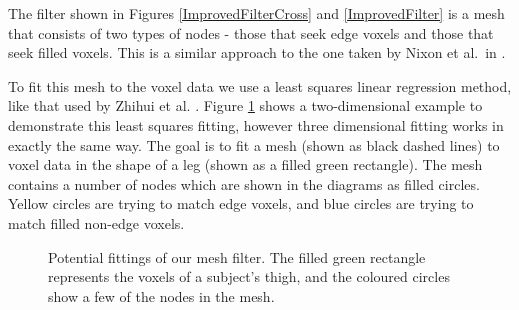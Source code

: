 \documentclass[a4paper,12pt]{article}
\begin{document}
The filter shown in Figures \ref{ImprovedFilterCross} and \ref{ImprovedFilter} is a mesh that consists of two types of nodes - those that seek edge voxels and those that seek filled voxels.
This is a similar approach to the one taken by Nixon et al.\ in \cite{GaitBook}.

\clearpage
To fit this mesh to the voxel data we use a least squares linear regression method, like that used by Zhihui et al. \cite{LinearModelFitting}.
Figure \ref{FittingImages} shows a two-dimensional example to demonstrate this least squares fitting, however three dimensional fitting works in exactly the same way.
The goal is to fit a mesh (shown as black dashed lines) to voxel data in the shape of a leg (shown as a filled green rectangle).
The mesh contains a number of nodes which are shown in the diagrams as filled circles.
Yellow circles are trying to match edge voxels, and blue circles are trying to match filled non-edge voxels.

\begin{figure}[bt]
	\centering
	\qquad
	\caption{Potential fittings of our mesh filter.
		The filled green rectangle represents the voxels of a subject's thigh,
		and the coloured circles show a few of the nodes in the mesh.}
	\label{FittingImages}
\end{figure}
\end{document}
